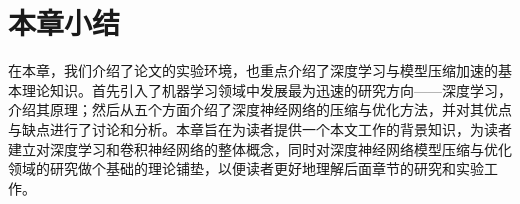%
%

\section{本章小结}

在本章，我们介绍了论文的实验环境，也重点介绍了深度学习与模型压缩加速的基本理论知识。首先引入了机器学习领域中发展最为迅速的研究方向——深度学习，介绍其原理；然后从五个方面介绍了深度神经网络的压缩与优化方法，并对其优点与缺点进行了讨论和分析。本章旨在为读者提供一个本文工作的背景知识，为读者建立对深度学习和卷积神经网络的整体概念，同时对深度神经网络模型压缩与优化领域的研究做个基础的理论铺垫，以便读者更好地理解后面章节的研究和实验工作。
